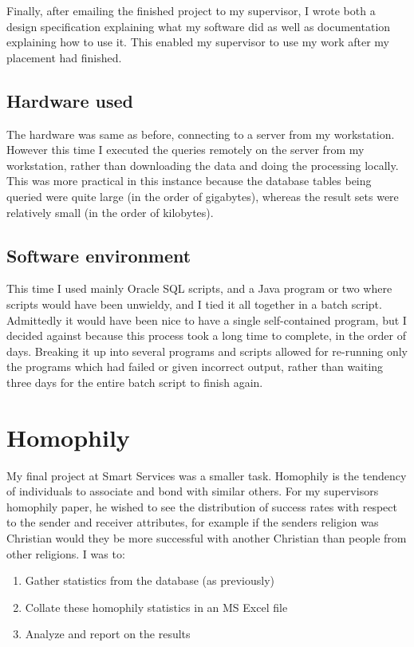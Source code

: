 \documentclass{report}
\begin{document}
Finally, after emailing the finished project to my supervisor, I wrote both a design specification explaining what my software did as well as documentation explaining how to use it. This enabled my supervisor to use my work after my placement had finished.

\subsection{Hardware used}
The hardware was same as before, connecting to a server from my workstation. However this time I executed the queries remotely on the server from my workstation, rather than downloading the data and doing the processing locally. This was more practical in this instance because the database tables being queried were quite large (in the order of gigabytes), whereas the result sets were relatively small (in the order of kilobytes).

\subsection{Software environment}
This time I used mainly Oracle SQL scripts, and a Java program or two where scripts would have been unwieldy, and I tied it all together in a batch script. Admittedly it would have been nice to have a single self-contained program, but I decided against because this process took a long time to complete, in the order of days. Breaking it up into several programs and scripts allowed for re-running only the programs which had failed or given incorrect output, rather than waiting three days for the entire batch script to finish again.

\section{Homophily}

My final project at Smart Services was a smaller task. Homophily is the tendency of individuals to associate and bond with similar others. For my supervisors homophily paper, he wished to see the distribution of success rates with respect to the sender and receiver attributes, for example if the senders religion was Christian would they be more successful with another Christian than people from other religions. I was to:
\begin{enumerate}
  \item Gather statistics from the database (as previously)
  \item Collate these homophily statistics in an MS Excel file
  \item Analyze and report on the results
\end{enumerate}
\end{document}
